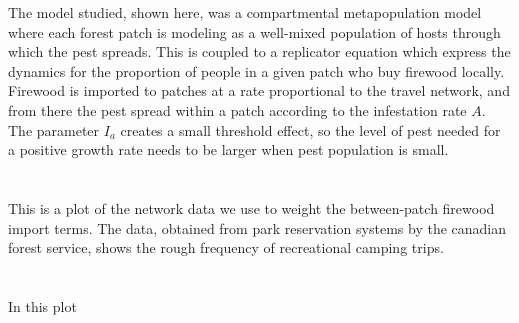 \documentclass{article}
\begin{document}
The model studied, shown here, was a compartmental metapopulation model where each forest patch is modeling as a well-mixed population of hosts through which the pest spreads. This is coupled to a replicator equation which express the dynamics for the proportion of people in a given patch who buy firewood locally. Firewood is imported to patches at a rate proportional to the travel network, and from there the pest spread within a patch according to the infestation rate $A$. The parameter $I_a$ creates a small threshold effect, so the level of pest needed for a positive growth rate needs to be larger when pest population is small. 

\section{}

This is a plot of the network data we use to weight the between-patch firewood import terms. The data, obtained from park reservation systems by the canadian forest service, shows the rough frequency of recreational camping trips.

\section{}




\section{}

In this plot 


\section{}


\section{}


\section{}
\end{document}
